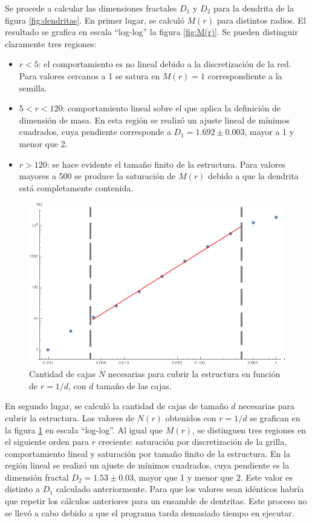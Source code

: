 \documentclass[aps,prb,twocolumn,superscriptaddress,floatfix,longbibliography]{revtex4-2}
\newcounter{para}
\begin{document}
Se procede a calcular las dimensiones fractales $D_1$ y $D_2$ para la dendrita de la figura \ref{fig:dendritas}. En primer lugar, se calculó $M(r)$ para distintos radios. El resultado se grafica en escala ``log-log'' la figura \ref{fig:M(r)}. Se pueden distinguir claramente tres regiones:

\begin{itemize}
    \item $r<5$: el comportamiento es no lineal debido a la discretización de la red. Para valores cercanos a 1 se satura en $M(r) = 1$ correspondiente a la semilla.
    \item $5<r<120$: comportamiento lineal sobre el que aplica la definición de dimensión de masa. En esta región se realizó un ajuste lineal de mínimos cuadrados, cuya pendiente corresponde a $D_1 = 1.692 \pm 0.003$, mayor a 1 y menor que 2.
    \item $r>120$: se hace evidente el tamaño finito de la estructura. Para valores mayores a 500 se produce la saturación de $M(r)$ debido a que la dendrita está completamente contenida.

\end{itemize}

\begin{figure}[h]
    \includegraphics[clip=true,width=\columnwidth]{N(r).png}
    \caption{Cantidad de cajas $N$ necesarias para cubrir la estructura en función de $r = 1/d$, con $d$ tamaño de las cajas.}
     \label{fig:N(r)}
\end{figure}


En segundo lugar, se calculó la cantidad de cajas de tamaño $d$ necesarias para cubrir la estructura. Los valores de $N(r)$ obtenidos con $r = 1/d$ se grafican en la figura \ref{fig:N(r)} en escala ``log-log''. Al igual que $M(r)$, se distinguen tres regiones en el siguiente orden para $r$ creciente: saturación por discretización de la grilla, comportamiento lineal y saturación por tamaño finito de la estructura. En la región lineal se realizó un ajuste de mínimos cuadrados, cuya pendiente es la dimensión fractal $D_2 = 1.53 \pm 0.03$, mayor que 1 y menor que 2. Este valor es distinto a $D_1$ calculado anteriormente. Para que los valores sean idénticos habría que repetir los cálculos anteriores para un ensamble de dentritas. Este proceso no se llevó a cabo debido a que el programa tarda demasiado tiempo en ejecutar.



\end{document}
